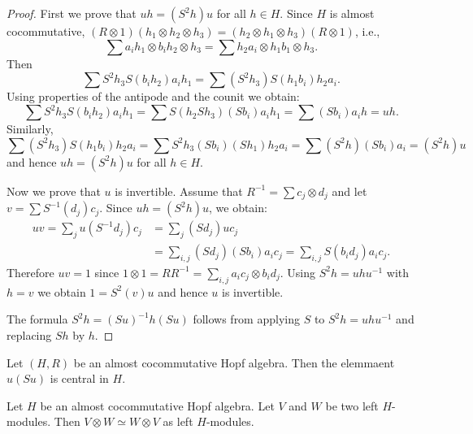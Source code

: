\begin{proof}
First we prove that $uh=(S^2h)u$ for all $h\in H$. Since $H$ is almost cocommutative, 
$(R\otimes1)(h_1\otimes h_2\otimes h_3)=(h_2\otimes h_1\otimes h_3)(R\otimes1)$, i.e.,
\[
\sum a_ih_1\otimes b_ih_2\otimes h_3=\sum h_2a_i\otimes h_1b_1\otimes h_3.
\]
Then
\[
\sum S^2h_3S(b_ih_2)a_ih_1=\sum (S^2h_3)S(h_1b_i)h_2a_i.
\]
Using properties of the antipode and the counit we obtain: 
\[
\sum S^2h_3S(b_ih_2)a_ih_1=\sum S(h_2Sh_3)(Sb_i)a_ih_1= \sum (Sb_i)a_ih=uh.
\]
Similarly, 
\[
\sum (S^2h_3)S(h_1b_i)h_2a_i=\sum S^2h_3(Sb_i)(Sh_1)h_2a_i=\sum (S^2h)(Sb_i)a_i=(S^2h)u
\]
and hence $uh=(S^2h)u$ for all $h\in H$.

Now we prove that $u$ is invertible. Assume that $R^{-1}=\sum c_j\otimes d_j$ and
let $v=\sum S^{-1}(d_j)c_j$. Since $uh=(S^2h)u$, we obtain: 
\begin{align*}
uv=\sum_j u(S^{-1}d_j)c_j&=\sum_j (Sd_j)uc_j\\
&=\sum_{i,j} (Sd_j)(Sb_i)a_ic_j=\sum_{i,j} S(b_id_j)a_ic_j.
\end{align*}
Therefore $uv=1$ since $1\otimes1=RR^{-1}=\sum_{i,j}a_ic_j\otimes b_id_j$.
Using $S^2h=uhu^{-1}$ with $h=v$ we obtain $1=S^2(v)u$ and hence $u$ is
invertible. 

The formula $S^2h=(Su)^{-1}h(Su)$ follows from applying $S$ to
$S^2h=uhu^{-1}$ and replacing $Sh$ by $h$.
\end{proof}

\begin{corollary}
Let $(H,R)$ be an almost cocommutative Hopf algebra. Then the elemmaent $u(Su)$
is central in $H$.
\end{corollary}

\begin{exercise}
\label{exercise:VW=WV}
Let $H$ be an almost cocommutative Hopf algebra. Let $V$ and $W$ be two left
$H$-modules.  Then $V\otimes W\simeq W\otimes V$ as left $H$-modules.
\end{exercise}

